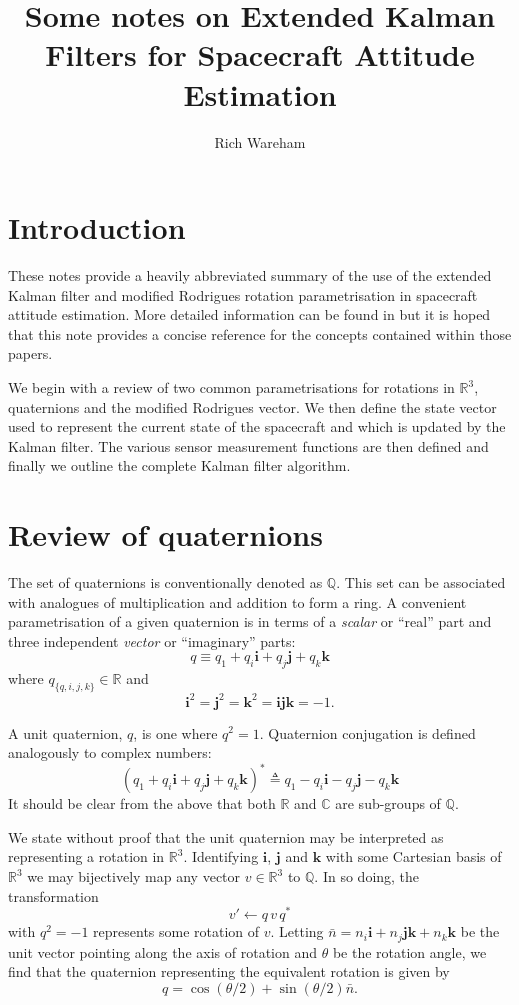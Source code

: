 \documentclass[a4paper]{paper}
\title{Some notes on Extended Kalman Filters for Spacecraft Attitude Estimation}
\author{Rich Wareham}
\begin{document}
\maketitle

\section{Introduction}

These notes provide a heavily abbreviated summary of the use of the extended
Kalman filter and modified Rodrigues rotation parametrisation in spacecraft
attitude estimation. More detailed information can be found in
\cite{crassidis1996attitude, karlgaard2009nonsingular} but it is hoped that this
note provides a concise reference for the concepts contained within those
papers.

We begin with a review of two common parametrisations for rotations in
$\mathbb{R}^3$, quaternions and the modified Rodrigues vector. We then define
the state vector used to represent the current state of the spacecraft and which
is updated by the Kalman filter. The various sensor measurement functions are
then defined and finally we outline the complete Kalman filter algorithm.

\section{Review of quaternions}

The set of quaternions is conventionally denoted as $\mathbb{Q}$. This set can
be associated with analogues of multiplication and addition to form a ring.  A
convenient parametrisation of a given quaternion is in terms of a
\emph{scalar} or ``real'' part and three independent \emph{vector} or
``imaginary'' parts:
$$
q \equiv q_1 + q_i \mathbf{i} + q_j \mathbf{j} + q_k \mathbf{k}
$$
where $q_{\{q,i,j,k\}} \in \mathbb{R}$ and
$$
\mathbf{i}^2 = \mathbf{j}^2 = \mathbf{k}^2 = \mathbf{ijk} = -1.
$$

A unit quaternion, $q$, is one where $q^2 = 1$. Quaternion conjugation is
defined analogously to complex numbers:
$$
\left(
	q_1 + q_i \mathbf{i} + q_j \mathbf{j} + q_k \mathbf{k}
\right)^* \triangleq
	q_1 - q_i \mathbf{i} - q_j \mathbf{j} - q_k \mathbf{k}
$$
It should be clear from the above that both $\mathbb{R}$ and $\mathbb{C}$ are
sub-groups of $\mathbb{Q}$.

We state without proof that the unit quaternion may be interpreted as
representing a rotation in $\mathbb{R}^3$. Identifying $\mathbf{i}$,
$\mathbf{j}$ and $\mathbf{k}$ with some Cartesian basis of $\mathbb{R}^3$ we may
bijectively map any vector $v \in \mathbb{R}^3$ to $\mathbb{Q}$. In so doing,
the transformation
$$
v' \leftarrow q \, v \, q^*
$$
with $q^2 = -1$ represents some rotation of $v$. Letting $\bar{n} = n_i
\mathbf{i} + n_j \mathbf{jk} + n_k \mathbf{k}$ be the unit vector pointing along
the axis of rotation and $\theta$ be the rotation angle, we find that the
quaternion representing the equivalent rotation is given by
$$
q = \cos\left(\theta / 2\right) + \sin\left(\theta / 2\right) \bar{n}.
$$
\end{document}
